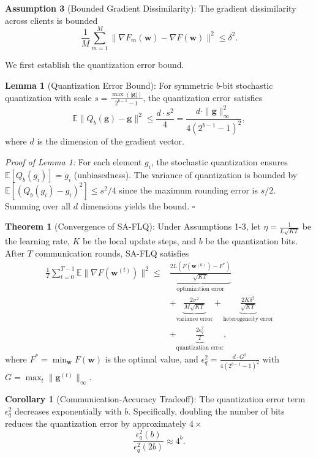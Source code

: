 \documentclass[journal]{IEEEtran}
\begin{document}
\textbf{Assumption 3} (Bounded Gradient Dissimilarity): The gradient dissimilarity across clients is bounded
\begin{equation}
    \frac{1}{M}\sum_{m=1}^{M}\|\nabla F_m(\mathbf{w}) - \nabla F(\mathbf{w})\|^2 \leq \delta^2.
\end{equation}

We first establish the quantization error bound.

\textbf{Lemma 1} (Quantization Error Bound): For symmetric $b$-bit stochastic quantization with scale $s = \frac{\max(|\mathbf{g}|)}{2^{b-1}-1}$, the quantization error satisfies
\begin{equation}
    \mathbb{E}\|Q_b(\mathbf{g}) - \mathbf{g}\|^2 \leq \frac{d \cdot s^2}{4} = \frac{d \cdot \|\mathbf{g}\|_\infty^2}{4(2^{b-1}-1)^2},
\end{equation}
where $d$ is the dimension of the gradient vector.

\textit{Proof of Lemma 1:} For each element $g_i$, the stochastic quantization ensures $\mathbb{E}[Q_b(g_i)] = g_i$ (unbiasedness). The variance of quantization is bounded by $\mathbb{E}[(Q_b(g_i) - g_i)^2] \leq s^2/4$ since the maximum rounding error is $s/2$. Summing over all $d$ dimensions yields the bound. $\square$

\textbf{Theorem 1} (Convergence of SA-FLQ): Under Assumptions 1-3, let $\eta = \frac{1}{L\sqrt{KT}}$ be the learning rate, $K$ be the local update steps, and $b$ be the quantization bits. After $T$ communication rounds, SA-FLQ satisfies
\begin{equation}
\begin{split}
    \frac{1}{T}\sum_{t=0}^{T-1}\mathbb{E}\|\nabla F(\mathbf{w}^{(t)})\|^2 \leq & \underbrace{\frac{2L(F(\mathbf{w}^{(0)}) - F^*)}{\sqrt{KT}}}_{\text{optimization error}} \\
    & + \underbrace{\frac{2\sigma^2}{M\sqrt{KT}}}_{\text{variance error}} + \underbrace{\frac{2K\delta^2}{\sqrt{KT}}}_{\text{heterogeneity error}} \\
    & + \underbrace{\frac{2\epsilon_q^2}{T}}_{\text{quantization error}},
\end{split}
\end{equation}
where $F^* = \min_{\mathbf{w}} F(\mathbf{w})$ is the optimal value, and $\epsilon_q^2 = \frac{d \cdot G^2}{4(2^{b-1}-1)^2}$ with $G = \max_t \|\mathbf{g}^{(t)}\|_\infty$.

\textbf{Corollary 1} (Communication-Accuracy Tradeoff): The quantization error term $\epsilon_q^2$ decreases exponentially with $b$. Specifically, doubling the number of bits reduces the quantization error by approximately $4\times$
\begin{equation}
    \frac{\epsilon_q^2(b)}{\epsilon_q^2(2b)} \approx 4^b.
\end{equation}
\end{document}
